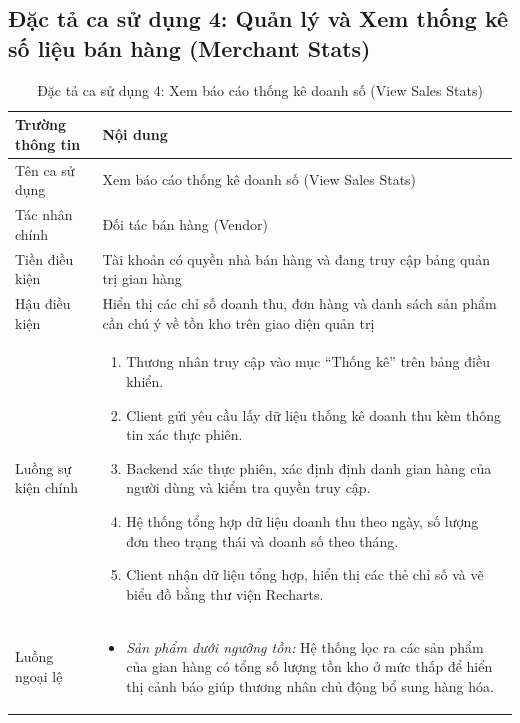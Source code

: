 \documentclass[../DoAn.tex]{subfiles}
\begin{document}
\subsection{Đặc tả ca sử dụng 4: Quản lý và Xem thống kê số liệu bán hàng (Merchant Stats)}

\begin{table}[H]
\centering
\caption{Đặc tả ca sử dụng 4: Xem báo cáo thống kê doanh số (View Sales Stats)}
\label{table:uc4_stats}
\renewcommand{\arraystretch}{1.4}
\begin{tabular}{|>{\columncolor{blue!6}\raggedright\arraybackslash}p{3.5cm}|>{\raggedright\arraybackslash}p{10.5cm}|}
\hline
\rowcolor{blue!18}
\textbf{Trường thông tin} & \textbf{Nội dung} \\
\hline
Tên ca sử dụng & Xem báo cáo thống kê doanh số (View Sales Stats) \\
\hline
Tác nhân chính & Đối tác bán hàng (Vendor) \\
\hline
Tiền điều kiện & Tài khoản có quyền nhà bán hàng và đang truy cập bảng quản trị gian hàng \\
\hline
Hậu điều kiện & Hiển thị các chỉ số doanh thu, đơn hàng và danh sách sản phẩm cần chú ý về tồn kho trên giao diện quản trị \\
\hline
Luồng sự kiện chính &
\begin{minipage}[t]{10.3cm}
\vspace{3pt}
\begin{enumerate}[leftmargin=1.5em, topsep=0pt, parsep=0pt, itemsep=2pt, partopsep=0pt]
    \item Thương nhân truy cập vào mục ``Thống kê'' trên bảng điều khiển.
    \item Client gửi yêu cầu lấy dữ liệu thống kê doanh thu kèm thông tin xác thực phiên.
    \item Backend xác thực phiên, xác định định danh gian hàng của người dùng và kiểm tra quyền truy cập.
    \item Hệ thống tổng hợp dữ liệu doanh thu theo ngày, số lượng đơn theo trạng thái và doanh số theo tháng.
    \item Client nhận dữ liệu tổng hợp, hiển thị các thẻ chỉ số và vẽ biểu đồ bằng thư viện Recharts.
\end{enumerate}
\vspace{3pt}
\end{minipage} \\
\hline
Luồng ngoại lệ &
\begin{minipage}[t]{10.3cm}
\vspace{3pt}
\begin{itemize}[leftmargin=1.5em, topsep=0pt, parsep=0pt, itemsep=2pt, partopsep=0pt]
    \item \textit{Sản phẩm dưới ngưỡng tồn:} Hệ thống lọc ra các sản phẩm của gian hàng có tổng số lượng tồn kho ở mức thấp để hiển thị cảnh báo giúp thương nhân chủ động bổ sung hàng hóa.
\end{itemize}
\vspace{3pt}
\end{minipage} \\
\hline
\end{tabular}
\end{table}
\end{document}
